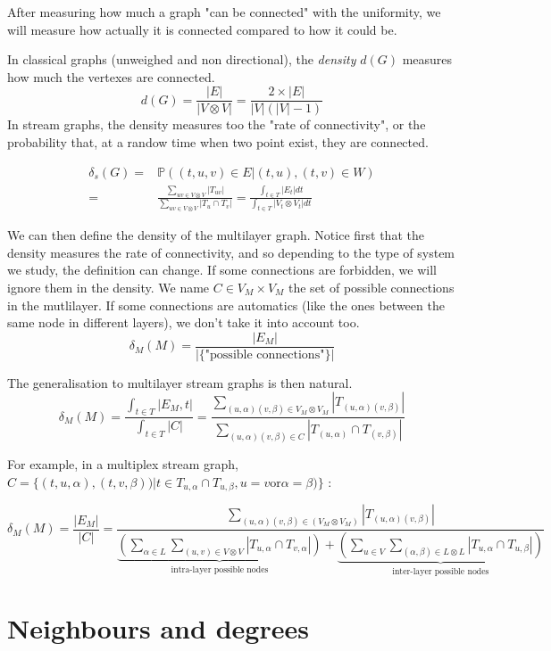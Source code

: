\documentclass[dvipsnames,a4paper,11pt]{article}
\theoremstyle{definition}
\theoremstyle{remark}
\theoremstyle{remark}
\begin{document}
    After measuring how much a graph "can be connected" with the uniformity, we will measure how actually it is connected compared to how it could be.
    
	In classical graphs (unweighed and non directional), the {\em density} $d(G)$ measures how much the vertexes are connected.
		\[
			d(G) = \frac{|E|}{|V\otimes V|} = \frac{2\times |E|}{|V|(|V|-1)}
		\]
	In stream graphs, the density measures too the "rate of connectivity", or the probability that, at a randow time when two point exist, they are connected.

		\begin{align*}
			\delta_s(G) = & \mathbb{P}((t,u,v)\in E| (t,u),(t,v) \in W) \\
			 =  & \frac{\sum_{uv \in V \otimes V}{|T_{uv}|}}{\sum_{uv \in V\otimes V}{|T_u\cap T_v|}}= \frac{\int_{t\in T}{|E_t|dt}}{\int_{t\in T}{|V_t\otimes V_t|dt}}
		\end{align*}

	We can then define the density of the multilayer graph. Notice first that the density measures the rate of connectivity, and so depending to the type of system we study, the definition can change. If some connections are forbidden, we will ignore them in the density. We name $C \in V_M\times V_M$ the set of possible connections in the mutlilayer. If some connections are automatics (like the ones between the same node in different layers), we don't take it into account too.
	\[
		\delta_M (M) = \frac{|E_M|}{|\{\text{"possible connections"}\}|}
	\]

	The generalisation to multilayer stream graphs is then natural.
	\[
		\delta_M (M) = \frac{\int_{t\in T}|E_M,t|}{\int_{t\in T}|C|} = \frac{\sum_{(u,\alpha)(v,\beta) \in V_M \otimes V_M}|T_{(u,\alpha)(v,\beta)}|}{\sum_{(u,\alpha)(v,\beta) \in C}|T_{(u,\alpha)}\cap T_{(v,\beta)}|}
	\]

	For example, in a multiplex stream graph, $C=\{(t,u,\alpha),(t,v,\beta))| t\in T_{u,\alpha} \cap T_{u,\beta}, u=v \text{or} \alpha = \beta)\}$ :

	\[
		\delta_M (M) = 
		\frac{|E_M|}{|C|}= 
		\frac{\sum_{(u,\alpha)(v,\beta) \in (V_M \otimes V_M)} |T_{(u,\alpha)(v,\beta)}|}
		{\underbrace{(\sum_{\alpha \in L}\sum_{(u,v) \in V\otimes V}|T_{u,\alpha} \cap T_{v,\alpha}|)}_{\text{intra-layer possible nodes}}+\underbrace{( \sum_{u \in V } \sum_{(\alpha,\beta) \in L \otimes L}|T_{u,\alpha}\cap T_{u,\beta}|)}_{\text{inter-layer possible nodes}}}
	\]

		\section{Neighbours and degrees}
	
\end{document}
